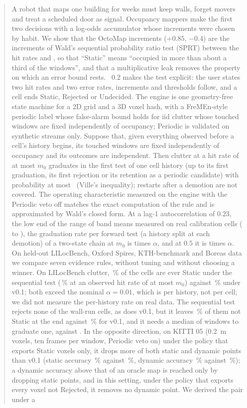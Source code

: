 \begin{abstract}
A robot that maps one building for weeks must keep walls, forget movers and treat a scheduled door as signal. Occupancy mappers make the first two decisions with a log-odds accumulator whose increments were chosen by habit. We show that the OctoMap increments ($+0.85$, $-0.4$) are the increments of Wald's sequential probability ratio test (SPRT) between the hit rates \SqLegMzero{} and \SqLegMone{}, so that ``Static'' means ``occupied in more than about a third of the windows'', and that a multiplicative leak removes the property on which an error bound rests. \sname\ 0.2 makes the test explicit: the user states two hit rates and two error rates, increments and thresholds follow, and a cell ends Static, Rejected or Undecided. The engine is one geometry-free state machine for a 2D grid and a 3D voxel hash, with a FreMEn-style periodic label whose false-alarm bound holds for iid clutter whose touched windows are fixed independently of occupancy; Periodic is validated on synthetic streams only. Suppose that, given everything observed before a cell's history begins, its touched windows are fixed independently of occupancy and its outcomes are independent. Then clutter at a hit rate of at most $m_0$ graduates in the first test of one cell history (up to its first graduation, its first rejection or its retention as a periodic candidate) with probability at most \SqVille\ (Ville's inequality); restarts after a demotion are not covered. The operating characteristic measured on the engine with the Periodic veto off matches the exact computation of the rule and is approximated by Wald's closed form. At a lag-1 autocorrelation of $0.23$, the low end of the range of band means measured on real calibration cells (\CalLagLo{} to \CalLagHi{}), the graduation rate per forward test (a history split at each demotion) of a two-state chain at $m_0$ is \SqAcTw{} times $\alpha$, and at $0.5$ it is \SqAcHalf{} times $\alpha$. On held-out LILocBench, Oxford Spires, KTH-benchmark and Boreas data we compare seven evidence rules, without tuning and without choosing a winner. On LILocBench clutter, \PtLilAllSprt\,\% of the cells are ever Static under the sequential test (\PtLilLeSprt\,\% at an observed hit rate of at most $m_0$) against \PtLilAllShipped\,\% under v0.1; both exceed the nominal $\alpha=0.01$, which is per history, not per cell; we did not measure the per-history rate on real data. The sequential test rejects none of the \PtWallN{} wall-run cells, as does v0.1, but it leaves \PtWallNotSprt\,\% of them not Static at the end against \PtWallNotShipped\,\% for v0.1, and it needs a median of \PtWallMedSprt{} windows to graduate one, against \PtWallMedShipped{}. In the opposite direction, on KITTI 05 (0.2~m voxels, ten frames per window, Periodic veto on) under the policy that exports Static voxels only, it drops more of both static and dynamic points than v0.1 (static accuracy \PtKthSASprt\,\% against \PtKthSAShipped\,\%, dynamic accuracy \PtKthDASprt\,\% against \PtKthDAShipped\,\%); a dynamic accuracy above that of an oracle map is reached only by dropping static points, and in this setting, under the policy that exports every voxel not Rejected, it removes no dynamic point. We derived the pair under a 
\end{abstract}
